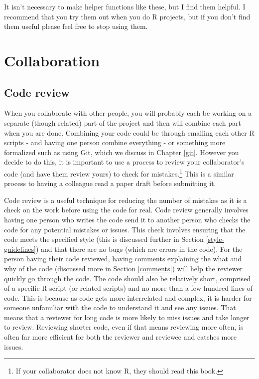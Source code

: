 \documentclass[
  a4paper,
]{krantz}
\begin{document}
It isn't necessary to make helper functions like these, but
I find them helpful. I recommend that you try them out when
you do R projects, but if you don't find them useful please
feel free to stop using them.

\hypertarget{collaboration}{%
\chapter{Collaboration}\label{collaboration}}

\hypertarget{code-review}{%
\section{Code review}\label{code-review}}

When you collaborate with other people, you will probably
each be working on a separate (though related) part of the
project and then will combine each part when you are done.
Combining your code could be through emailing each other R
scripts - and having one person combine everything - or
something more formalized such as using Git, which we
discuss in Chapter \ref{git}. However you decide to do this,
it is important to use a process to review your
collaborator's code (and have them review yours) to check
for mistakes.\footnote{If your collaborator does not know R,
  they should read this book.} This is a similar process to
having a colleague read a paper draft before submitting it.

Code review is a useful technique for reducing the number of
mistakes as it is a check on the work before using the code
for real. Code review generally involves having one person
who writes the code send it to another person who checks the
code for any potential mistakes or issues. This check
involves ensuring that the code meets the specified style
(this is discussed further in Section
\ref{style-guidelines}) and that there are no bugs (which
are errors in the code). For the person having their code
reviewed, having comments explaining the what and why of the
code (discussed more in Section \ref{comments}) will help
the reviewer quickly go through the code. The code should
also be relatively short, comprised of a specific R script
(or related scripts) and no more than a few hundred lines of
code. This is because as code gets more interrelated and
complex, it is harder for someone unfamiliar with the code
to understand it and see any issues. That means that a
reviewer for long code is more likely to miss issues and
take longer to review. Reviewing shorter code, even if that
means reviewing more often, is often far more efficient for
both the reviewer and reviewee and catches more issues.
\end{document}

